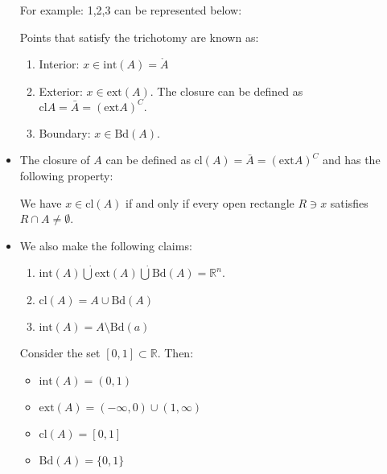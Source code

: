 \begin{itemize}
          For example: 1,2,3 can be represented below:
          \begin{center}
          \end{center}
        \begin{definition}
            Points that satisfy the trichotomy are known as: 
            \begin{enumerate}
                \item Interior: $x\in \text{int}(A) = \mathring{A}$
                \item Exterior: $x\in \text{ext}(A)$. The closure can be defined as $\text{cl}A=\bar{A}=(\text{ext} A)^C.$
                \item Boundary: $x\in \text{Bd}(A).$
            \end{enumerate}
        \end{definition}
        \item The closure of $A$ can be defined as $\text{cl}(A) = \bar{A} =(\text{ext} A)^C$ and has the following property:
        \begin{theorem}
            We have $x\in \text{cl}(A)$ if and only if every open rectangle $R\ni x$ satisfies $R\cap A \neq \emptyset$.
        \end{theorem}
        \item We also make the following claims:
        \begin{enumerate}
            \item $\text{int}(A) \dot{\bigcup} \text{ext}(A) \dot{\bigcup} \text{Bd}(A) = \mathbb{R}^n$.
            \item $\text{cl}(A) = A \cup \text{Bd}(A)$
            \item $\text{int}(A) = A \setminus \text{Bd}(a)$ 
        \end{enumerate}
        \begin{example}
            Consider the set $[0,1] \subset \mathbb{R}$. Then: 
            \begin{itemize}
                \item $\text{int}(A) = (0,1)$
                \item $\text{ext}(A) = (-\infty,0)\cup (1,\infty)$
                \item $\text{cl}(A) = [0,1]$
                \item $\text{Bd}(A) = \{0,1\}$
            \end{itemize}
        \end{example}
\end{itemize}
